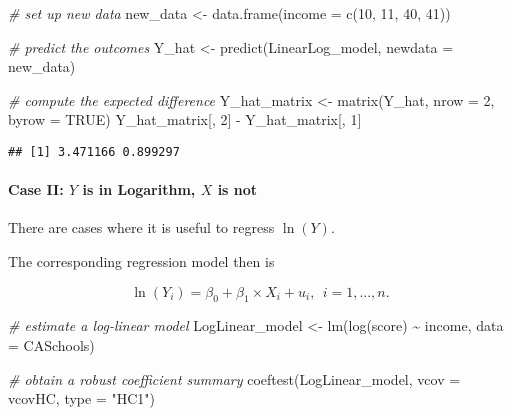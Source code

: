 \documentclass[
]{article}
\newenvironment{Shaded}{\begin{snugshade}}{\end{snugshade}}
\newcommand{\AttributeTok}[1]{\textcolor[rgb]{0.77,0.63,0.00}{#1}}
\newcommand{\CommentTok}[1]{\textcolor[rgb]{0.56,0.35,0.01}{\textit{#1}}}
\newcommand{\ConstantTok}[1]{\textcolor[rgb]{0.00,0.00,0.00}{#1}}
\newcommand{\DecValTok}[1]{\textcolor[rgb]{0.00,0.00,0.81}{#1}}
\newcommand{\FunctionTok}[1]{\textcolor[rgb]{0.00,0.00,0.00}{#1}}
\newcommand{\NormalTok}[1]{#1}
\newcommand{\OtherTok}[1]{\textcolor[rgb]{0.56,0.35,0.01}{#1}}
\newcommand{\SpecialCharTok}[1]{\textcolor[rgb]{0.00,0.00,0.00}{#1}}
\newcommand{\StringTok}[1]{\textcolor[rgb]{0.31,0.60,0.02}{#1}}
\begin{document}
\begin{Shaded}
\begin{Highlighting}[]
\CommentTok{\# set up new data}
\NormalTok{new\_data }\OtherTok{\textless{}{-}} \FunctionTok{data.frame}\NormalTok{(}\AttributeTok{income =} \FunctionTok{c}\NormalTok{(}\DecValTok{10}\NormalTok{, }\DecValTok{11}\NormalTok{, }\DecValTok{40}\NormalTok{, }\DecValTok{41}\NormalTok{))}

\CommentTok{\# predict the outcomes }
\NormalTok{Y\_hat }\OtherTok{\textless{}{-}} \FunctionTok{predict}\NormalTok{(LinearLog\_model, }\AttributeTok{newdata =}\NormalTok{ new\_data)}

\CommentTok{\# compute the expected difference}
\NormalTok{Y\_hat\_matrix }\OtherTok{\textless{}{-}} \FunctionTok{matrix}\NormalTok{(Y\_hat, }\AttributeTok{nrow =} \DecValTok{2}\NormalTok{, }\AttributeTok{byrow =} \ConstantTok{TRUE}\NormalTok{)}
\NormalTok{Y\_hat\_matrix[, }\DecValTok{2}\NormalTok{] }\SpecialCharTok{{-}}\NormalTok{ Y\_hat\_matrix[, }\DecValTok{1}\NormalTok{]}
\end{Highlighting}
\end{Shaded}

\begin{verbatim}
## [1] 3.471166 0.899297
\end{verbatim}

\hypertarget{case-ii-y-is-in-logarithm-x-is-not}{%
\paragraph*{\texorpdfstring{Case II: \(Y\) is in Logarithm, \(X\) is
not}{Case II: Y is in Logarithm, X is not}}\label{case-ii-y-is-in-logarithm-x-is-not}}

There are cases where it is useful to regress \(\ln(Y)\).

The corresponding regression model then is

\[ \ln(Y_i) = \beta_0 + \beta_1 \times X_i + u_i , \ \ i=1,...,n. \]

\begin{Shaded}
\begin{Highlighting}[]
\CommentTok{\# estimate a log{-}linear model }
\NormalTok{LogLinear\_model }\OtherTok{\textless{}{-}} \FunctionTok{lm}\NormalTok{(}\FunctionTok{log}\NormalTok{(score) }\SpecialCharTok{\textasciitilde{}}\NormalTok{ income, }\AttributeTok{data =}\NormalTok{ CASchools)}

\CommentTok{\# obtain a robust coefficient summary}
\FunctionTok{coeftest}\NormalTok{(LogLinear\_model, }
         \AttributeTok{vcov =}\NormalTok{ vcovHC, }\AttributeTok{type =} \StringTok{"HC1"}\NormalTok{)}
\end{Highlighting}
\end{Shaded}
\end{document}
